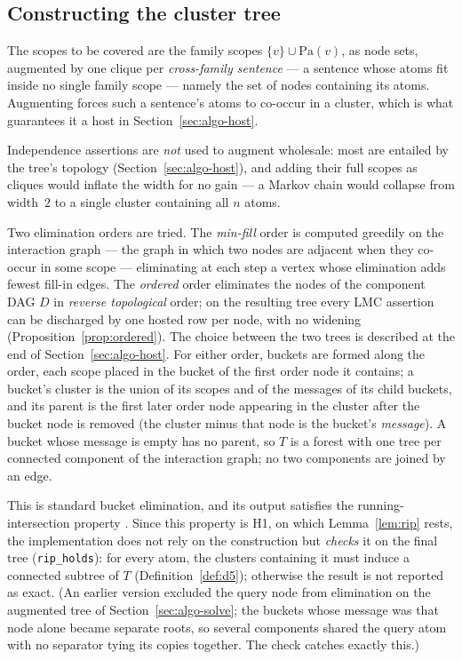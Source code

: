 \documentclass{article} %
\DeclareRobustCommand{\rev}[1]{{\color{blue}#1}}
\providecommand{\Pa}{\mathrm{Pa}}
\begin{document}
\subsection{Constructing the cluster tree}\label{sec:algo-jt}

The scopes to be covered are the family scopes $\{v\}\cup\Pa(v)$, as node sets,
augmented by one clique per \emph{cross-family sentence} --- a sentence whose
atoms fit inside no single family scope --- namely the set of nodes containing
its atoms. Augmenting forces such a sentence's atoms to co-occur in a cluster,
which is what guarantees it a host in Section~\ref{sec:algo-host}.

Independence assertions are \emph{not} used to augment wholesale: most are
entailed by the tree's topology (Section~\ref{sec:algo-host}), and adding their
full scopes as cliques would inflate the width for no gain --- a Markov chain
would collapse from width~$2$ to a single cluster containing all $n$ atoms.

Two elimination orders are tried. The \emph{min-fill} order is computed greedily
on the interaction graph --- the graph in which two nodes are adjacent when they
co-occur in some scope --- eliminating at each step a vertex whose elimination
adds fewest fill-in edges. The \emph{ordered} order eliminates the nodes of the
component DAG $D$ in \emph{reverse topological} order; on the resulting
tree every LMC assertion can be discharged by one hosted row per node, with no
widening (Proposition~\ref{prop:ordered}). The choice between the two trees is
described at the end of Section~\ref{sec:algo-host}. For either order, buckets are
formed along the order, each scope placed in the bucket of the first order node
it contains; a bucket's cluster is the union of its scopes and of the messages of
its child buckets, and its parent is the first later order node appearing in the
cluster after the bucket node is removed (the cluster minus that node is the
bucket's \emph{message}). A bucket whose message is empty has no parent, so $T$ is
a forest with one tree per connected component of the interaction graph; no two
components are joined by an edge.

This is standard bucket elimination, and its output satisfies the
running-intersection property \rev{\citep{beeri83,spiegelhalter88}}. Since this property is H1, on
which Lemma~\ref{lem:rip} rests, the implementation does not rely on the
construction but \emph{checks} it on the final tree (\texttt{rip\_holds}): for every
atom, the clusters containing it must induce a connected subtree of $T$
(Definition~\ref{def:d5}); otherwise the result is not reported as exact. (An
earlier version excluded the query node from elimination on the augmented tree of
Section~\ref{sec:algo-solve}; the buckets whose message was that node alone became
separate roots, so several components shared the query atom with no separator
tying its copies together. The check catches exactly this.)
\end{document}
